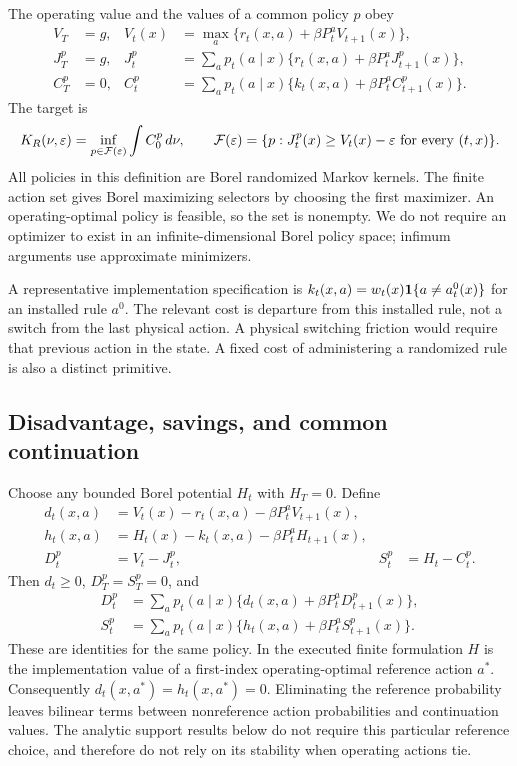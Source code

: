 The operating value and the values of a common policy $p$ obey
\begin{align}
 V_T&=g,& V_t(x)&=\max_a\{r_t(x,a)+\beta P_t^aV_{t+1}(x)\},\label{eq:V45}\\
 J_T^p&=g,& J_t^p&=\sum_a p_t(a\mid x)\{r_t(x,a)+\beta P_t^aJ_{t+1}^p(x)\},\label{eq:J45}\\
 C_T^p&=0,& C_t^p&=\sum_a p_t(a\mid x)\{k_t(x,a)+\beta P_t^aC_{t+1}^p(x)\}.\label{eq:C45}
\end{align}
The target is
\begin{equation}\label{eq:target45}
 K_R(\nu,\varepsilon)=\inf_{p\in\mathcal F(\varepsilon)}\int C_0^p\,d\nu,
 \qquad \mathcal F(\varepsilon)=\{p:J_t^p(x)\ge V_t(x)-\varepsilon\ \hbox{for every }(t,x)\}.
\end{equation}
All policies in this definition are Borel randomized Markov kernels. The finite action set gives Borel maximizing selectors by choosing the first maximizer. An operating-optimal policy is feasible, so the set is nonempty. We do not require an optimizer to exist in an infinite-dimensional Borel policy space; infimum arguments use approximate minimizers.

A representative implementation specification is $k_t(x,a)=w_t(x)\mathbf 1\{a\ne a_t^0(x)\}$ for an installed rule $a^0$. The relevant cost is departure from this installed rule, not a switch from the last physical action. A physical switching friction would require that previous action in the state. A fixed cost of administering a randomized rule is also a distinct primitive.

\subsection{Disadvantage, savings, and common continuation}
Choose any bounded Borel potential $H_t$ with $H_T=0$. Define
\begin{align}
 d_t(x,a)&=V_t(x)-r_t(x,a)-\beta P_t^aV_{t+1}(x),\label{eq:d45}\\
 h_t(x,a)&=H_t(x)-k_t(x,a)-\beta P_t^aH_{t+1}(x),\label{eq:h45}\\
 D_t^p&=V_t-J_t^p, & S_t^p&=H_t-C_t^p.\nonumber
\end{align}
Then $d_t\ge0$, $D_T^p=S_T^p=0$, and
\begin{align}
 D_t^p&=\sum_a p_t(a\mid x)\{d_t(x,a)+\beta P_t^aD_{t+1}^p(x)\},\label{eq:D45}\\
 S_t^p&=\sum_a p_t(a\mid x)\{h_t(x,a)+\beta P_t^aS_{t+1}^p(x)\}.\label{eq:S45}
\end{align}
These are identities for the same policy. In the executed finite formulation $H$ is the implementation value of a first-index operating-optimal reference action $a^*$. Consequently $d_t(x,a^*)=h_t(x,a^*)=0$. Eliminating the reference probability leaves bilinear terms between nonreference action probabilities and continuation values. The analytic support results below do not require this particular reference choice, and therefore do not rely on its stability when operating actions tie.
